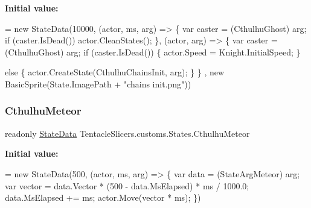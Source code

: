 {\bfseries Initial value\+:}
\begin{DoxyCode}
= \textcolor{keyword}{new} StateData(10000, (actor, ms, arg) =>
        \{
            var caster = (CthulhuGhost) arg;
            \textcolor{keywordflow}{if} (caster.IsDead()) actor.CleanStates();
        \}, (actor, arg) =>
        \{
            var caster = (CthulhuGhost) arg;
            \textcolor{keywordflow}{if} (caster.IsDead())
            \{
                actor.Speed = Knight.InitialSpeed;
            \}
            
            \textcolor{keywordflow}{else}
            \{
                actor.CreateState(CthulhuChainsInit, arg);
            \}
        \} , \textcolor{keyword}{new} BasicSprite(State.ImagePath + \textcolor{stringliteral}{"chains init.png"}))
\end{DoxyCode}
\mbox{\label{class_tentacle_slicers_1_1customs_1_1_states_ab9be28255c455aa0da93137a074e411c}} 
\subsubsection{\texorpdfstring{Cthulhu\+Meteor}{CthulhuMeteor}}
{\footnotesize\ttfamily readonly \hyperlink{class_tentacle_slicers_1_1states_1_1_state_data}{State\+Data} Tentacle\+Slicers.\+customs.\+States.\+Cthulhu\+Meteor\hspace{0.3cm}{\ttfamily [static]}}

{\bfseries Initial value\+:}
\begin{DoxyCode}
= \textcolor{keyword}{new} StateData(500, (actor, ms, arg) =>
        \{
            var data = (StateArgMeteor) arg;
            var vector = data.Vector * (500 - data.MsElapsed) * ms / 1000.0;
            data.MsElapsed += ms;
            actor.Move(vector * ms);
        \})
\end{DoxyCode}
\mbox{\label{class_tentacle_slicers_1_1customs_1_1_states_a179ee128f8b45b11903117ca7827ee52}} 

